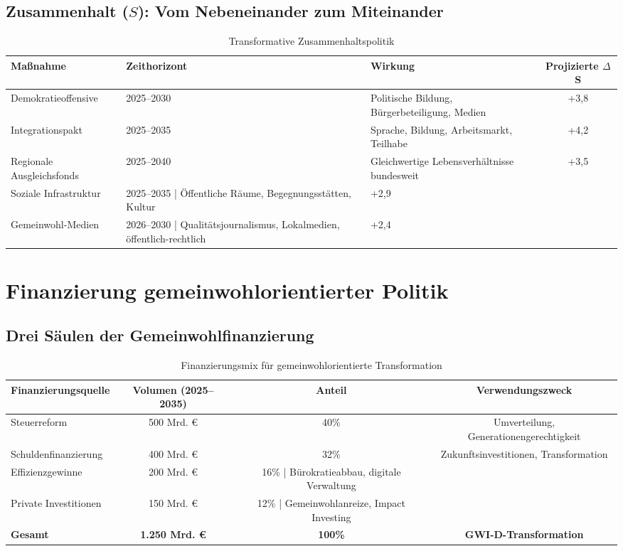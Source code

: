 \subsection{Zusammenhalt (\(S\)): Vom Nebeneinander zum Miteinander}

\begin{table}[ht]
    \centering
    \caption{Transformative Zusammenhaltspolitik}
    \label{tab:zusammenhaltspolitik_transformativ}
    \begin{tabular}{llp{6cm}c}
        \toprule
        \textbf{Maßnahme} & \textbf{Zeithorizont} & \textbf{Wirkung} & \textbf{Projizierte $\Delta$ S} \\
        \midrule
        Demokratieoffensive & 2025–2030 & Politische Bildung, Bürgerbeteiligung, Medien & +3,8 \\
        Integrationspakt & 2025–2035 & Sprache, Bildung, Arbeitsmarkt, Teilhabe & +4,2 \\
        Regionale Ausgleichsfonds & 2025–2040 & Gleichwertige Lebensverhältnisse bundesweit & +3,5 \\
        Soziale Infrastruktur & 2025–2035 | Öffentliche Räume, Begegnungsstätten, Kultur & +2,9 \\
        Gemeinwohl-Medien & 2026–2030 | Qualitätsjournalismus, Lokalmedien, öffentlich-rechtlich & +2,4 \\
        \bottomrule
    \end{tabular}
\end{table}

\section{Finanzierung gemeinwohlorientierter Politik}

\subsection{Drei Säulen der Gemeinwohlfinanzierung}

\begin{table}[ht]
    \centering
    \caption{Finanzierungsmix für gemeinwohlorientierte Transformation}
    \label{tab:finanzierung_gemeinwohl}
    \begin{tabular}{lccc}
        \toprule
        \textbf{Finanzierungsquelle} & \textbf{Volumen (2025–2035)} & \textbf{Anteil} & \textbf{Verwendungszweck} \\
        \midrule
        Steuerreform & 500 Mrd. € & 40\% & Umverteilung, Generationengerechtigkeit \\
        Schuldenfinanzierung & 400 Mrd. € & 32\% & Zukunftsinvestitionen, Transformation \\
        Effizienzgewinne & 200 Mrd. € & 16\% | Bürokratieabbau, digitale Verwaltung \\
        Private Investitionen & 150 Mrd. € & 12\% | Gemeinwohlanreize, Impact Investing \\
        \midrule
        \textbf{Gesamt} & \textbf{1.250 Mrd. €} & \textbf{100\%} & \textbf{GWI-D-Transformation} \\
        \bottomrule
    \end{tabular}
\end{table}

